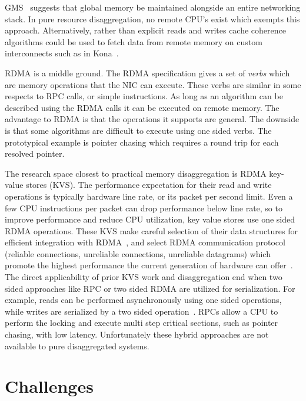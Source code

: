 GMS~\cite{gms} suggests that global memory be maintained alongside an entire
networking stack. In pure resource disaggregation, no remote CPU's exist which
exempts this approach.  Alternatively, rather than explicit reads and writes
cache coherence algorithms could be used to fetch data from remote memory on
custom interconnects such as in Kona~\cite{kona}.

RDMA is a middle ground. The RDMA specification gives a set of \textit{verbs}
which are memory operations that the NIC can execute. These verbs are similar in
some respects to RPC calls, or simple instructions. As long as an algorithm can
be described using the RDMA calls it can be executed on remote memory. The
advantage to RDMA is that the operations it supports are general. The downside
is that some algorithms are difficult to execute using one sided verbs. The
prototypical example is pointer chasing which requires a round trip for each
resolved pointer.

The research space closest to practical memory disaggregation is RDMA key-value
stores (KVS). The performance expectation for their read and write operations is
typically hardware line rate, or its packet per second limit. Even a few CPU
instructions per packet can drop performance below line rate, so to improve
performance and reduce CPU utilization, key value stores use one sided RDMA
operations. These KVS make careful selection of their data structures for
efficient integration with RDMA~\cite{hopscotch,cuckoo}, and select RDMA
communication protocol (reliable connections, unreliable connections, unreliable
datagrams) which promote the highest performance the current generation of
hardware can offer~\cite{herd,storm}. The direct applicability of prior KVS work
and disaggregation end when two sided approaches like RPC or two sided RDMA are
utilized for serialization. For example, reads can be performed asynchronously
using one sided operations, while writes are serialized by a two sided
operation~\cite{pilaf}. RPCs allow a CPU to perform the locking and execute
multi step critical sections, such as pointer chasing, with low latency.
Unfortunately these hybrid approaches are not available to pure disaggregated
systems.


\section{Challenges}

